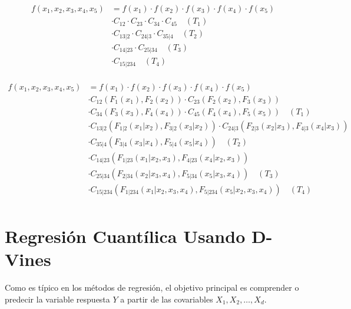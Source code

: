 \begin{equation}\label{dist5}
     \begin{split}
         f(x_1, x_2, x_3, x_4, x_5) & = f(x_1) \cdot f(x_2) \cdot f(x_3) \cdot f(x_4) \cdot f(x_5)  \\
         & \cdot C_{12} \cdot C_{23} \cdot C_{34} \cdot C_{45} \quad (T_1)\\
         & \cdot C_{13|2} \cdot C_{24|3} \cdot C_{35|4} \quad (T_2)\\\
         & \cdot C_{14|23} \cdot C_{25|34} \quad (T_3)\\
         & \cdot C_{15|234} \quad (T_4)\\
     \end{split}
\end{equation}


\begin{equation}\label{distC5}
     \begin{split}
         f(x_1, x_2, x_3, x_4, x_5) & = f(x_1) \cdot f(x_2) \cdot f(x_3) \cdot f(x_4) \cdot f(x_5)  \\
         & \cdot C_{12}(F_1(x_1), F_2(x_2)) \cdot C_{23}(F_2(x_2), F_3(x_3)) \\
         & \cdot C_{34}(F_3(x_3), F_4(x_4)) \cdot C_{45}(F_4(x_4), F_5(x_5)) \quad (T_1)\\
         & \cdot C_{13|2}(F_{1|2}(x_1|x_2), F_{3|2}(x_3|x_2)) \cdot C_{24|3}(F_{2|3}(x_2|x_3), F_{4|3}(x_4|x_3))\\
         &\cdot C_{35|4}(F_{3|4}(x_3|x_4), F_{5|4}(x_5|x_4)) \quad (T_2)\\
         & \cdot C_{14|23}(F_{1|23}(x_1|x_2, x_3), F_{4|23}(x_4|x_2, x_3)) \\
         & \cdot C_{25|34}(F_{2|34}(x_2|x_3, x_4), F_{5|34}(x_5|x_3, x_4)) \quad (T_3)\\
         & \cdot C_{15|234}(F_{1|234}(x_1|x_2, x_3, x_4), F_{5|234}(x_5|x_2, x_3, x_4)) \quad (T_4)\\
     \end{split}
\end{equation}

\section{Regresión Cuantílica Usando D-Vines}

Como es típico en los métodos de regresión, el objetivo principal es comprender o predecir la variable respuesta $Y$ a partir de las covariables $X_1, X_2, \dots , X_d$.

